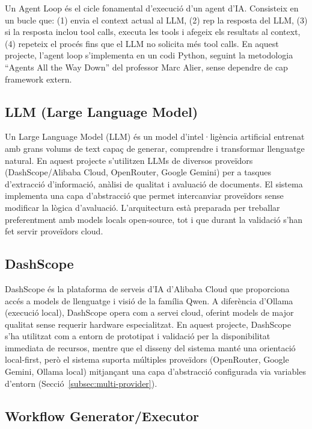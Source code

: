 \documentclass[12pt,a4paper,twoside]{report}
\begin{document}
Un Agent Loop \'es el cicle fonamental d'execuci\'o d'un agent d'IA. Consisteix en un bucle que: (1) envia el context actual al LLM, (2) rep la resposta del LLM, (3) si la resposta inclou tool calls, executa les tools i afegeix els resultats al context, (4) repeteix el proc\'es fins que el LLM no solicita m\'es tool calls. En aquest projecte, l'agent loop s'implementa en un codi Python, seguint la metodologia ``Agents All the Way Down'' del professor Marc Alier, sense dependre de cap framework extern.

\subsection{LLM (Large Language Model)}
\label{subsec:llm}

Un Large Language Model (LLM) \'es un model d'intel·lig\`encia artificial entrenat amb grans volums de text capa\c{c} de generar, comprendre i transformar llenguatge natural. En aquest projecte s'utilitzen LLMs de diversos prove\"idors (DashScope/Alibaba Cloud, OpenRouter, Google Gemini) per a tasques d'extracci\'o d'informaci\'o, an\`alisi de qualitat i avaluaci\'o de documents. El sistema implementa una capa d'abstracci\'o que permet intercanviar prove\"idors sense modificar la l\`ogica d'avaluaci\'o. L’arquitectura està preparada per treballar preferentment amb models locals open-source, tot i que durant la validació s’han fet servir proveïdors cloud.

\subsection{DashScope}

DashScope \'es la plataforma de serveis d'IA d'Alibaba Cloud que proporciona acc\'es a models de llenguatge i visi\'o de la fam\'ilia Qwen. A difer\`encia d'Ollama (execuci\'o local), DashScope opera com a servei cloud, oferint models de major qualitat sense requerir hardware especialitzat. En aquest projecte, DashScope s’ha utilitzat com a entorn de prototipat i validació per la disponibilitat immediata de recursos, mentre que el disseny del sistema manté una orientació local-first, per\`o el sistema suporta m\'ultiples prove\"idors (OpenRouter, Google Gemini, Ollama local) mitjan\c{c}ant una capa d'abstracci\'o configurada via variables d'entorn (Secci\'o~\ref{subsec:multi-provider}).

\subsection{Workflow Generator/Executor}
\label{subsec:workflow}
\end{document}
